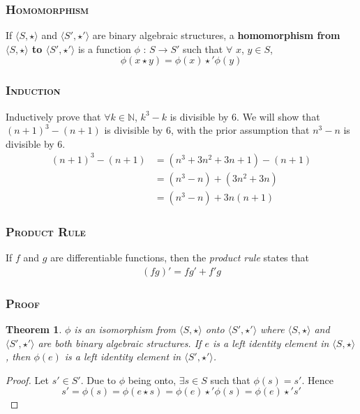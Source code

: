\documentclass{article}
\newtheorem{theorem}{Theorem}
\begin{document}
\subsubsection{\textsc{Homomorphism}}
If $\langle S,\star\rangle$ and $\langle S',\star'\rangle$ are binary algebraic structures, a \textbf{homomorphism from $\langle S,\star\rangle$ to $\langle S',\star'\rangle$} is a function $\phi$ : $S\rightarrow S'$ such that $\forall$ $x$, $y\in S$,\begin{equation*}\phi(x\star y) = \phi(x) \star'\phi(y)
\end{equation*}
\subsubsection{\textsc{Induction}}
Inductively prove that $\forall k\in\mathbb{N}$, $k^3 - k$ is divisible by 6. We will show that $(n+1)^3 - (n+1)$ is divisible by 6, with the prior assumption that $n^3 - n$ is divisible by 6.\begin{align*}(n+1)^3 - (n + 1) &= (n^3 +3n^2 + 3n + 1) - (n + 1)\\&= (n^3 - n) + (3n^2 + 3n)\\&= (n^3 - n) + 3n(n+1)
\end{align*}
\subsubsection{\textsc{Product Rule}}
If $f$ and $g$ are differentiable functions, then the \textit{product rule} states that \begin{align*}(fg)' = fg' + f'g 
\end{align*}
\subsubsection{\textsc{Proof}}
\begin{theorem} $\phi$ is an isomorphism from $\langle S,\star\rangle$ onto $\langle S',\star'\rangle$ where $\langle S,\star\rangle$ and $\langle S',\star'\rangle$ are both binary algebraic structures. If $e$ is a left identity element in $\langle S,\star\rangle$, then $\phi(e)$ is a left identity element in $\langle S',\star'\rangle$.\end{theorem}
        
        \begin{proof}Let $s'\in S'$. Due to $\phi$ being onto, $\exists s\in S$ such that $\phi(s) = s'$. Hence\begin{equation*}s' = \phi(s) = \phi(e\star s) = \phi(e)\star'\phi(s) = \phi(e)\star's'\end{equation*}\end{proof}
\end{document}
